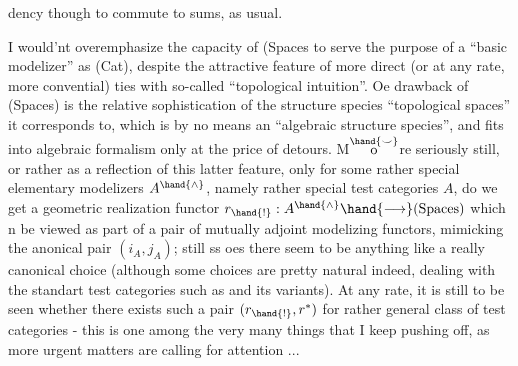 dency though to commute to sums,  as usual.

I would'nt overemphasize the capacity of (Spaces to serve the purpose
of a ``basic modelizer'' as  (Cat),  despite the attractive feature of more
direct (or at any rate,  more convential) ties with so-called ``topological
intuition''.  Oe drawback of (Spaces) is the relative sophistication of
the structure species ``topological spaces'' it corresponds to,  which is
by no means an ``algebraic structure species'',  and fits into algebraic
formalism only at the price of detours.  M$\overset{\hand{\smile}}{\mathrm{o}}$re seriously still,  or rather
as a reflection of this latter feature,  only for some rather special
elementary modelizers $A^{\hand{\wedge}}$,  namely rather special test categories $A$,  do
we get a geometric realization functor $r_{\hand{!}} : A^{\hand{\wedge}} \hand{\longrightarrow} (\mathrm{Spaces})$ which n be
viewed as part of a pair of mutually adjoint modelizing functors,
mimicking the anonical pair $(i_A, j_A)$;  still ss oes there seem to be
anything like a really canonical choice (although some choices are pretty
natural indeed,  dealing with the standart test categories such as \hand{$\Delta$} and
its variants).  At any rate,  it is still to be seen whether there exists
such a pair  $(r_{\hand{!}}, r^{*})$  for  rather general class of test categories  -
this is one among the very many things that I keep pushing off,  as more
urgent matters are calling for attention ...

